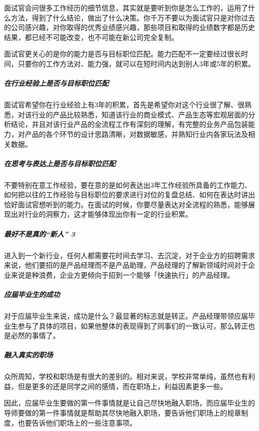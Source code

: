 \documentclass[letterpaper,10pt,english]{sphinxmanual}
\begin{document}
面试官会问很多工作经历的细节信息，其实就是要听到你是怎么工作的，运用了什么方法，得到了什么结论，做出了什么决策。你千万不要以为面试官只是对你过去的公司感兴趣，对你取得的优秀业绩感兴趣，那些项目和取得的业绩数字都是历史结果，都已经不可能改变，也不可能在新公司完全复制。

面试官更关心的是你的能力是否与目标职位匹配。能力匹配不一定要经过很长时间，只要你的工作方法对、能力强，就可以在短时间内达到别人3年或5年的积累。


\subparagraph{在行业经验上是否与目标职位匹配}
\label{\detokenize{chapter_interview/new_like:id11}}
面试官希望你在行业经验上有3年的积累，首先是希望你对这个行业很了解、很熟悉，对该行业的产品比较熟悉，知道该行业的商业模式、产品生态等宏观层面的分析结论，并且对该行业产品的全流程工作有深刻的理解，有完整的业务产品包装能力，对产品的各个环节的设计思路清晰，对数据敏感，并熟知行业内各家玩法及相关数据。


\subparagraph{在思考与表达上是否与目标职位匹配}
\label{\detokenize{chapter_interview/new_like:id12}}
不要特别在意工作经验，要在意的是如何表达出3年工作经验所具备的工作能力、如何把以往的工作经验与目标职位的要求进行对位的复盘总结、如何在表达时讲出恰好面试官想听到的能力。在面试的时候，你要尽量表达对全流程的熟悉，能够展现出对行业的洞察力，这才能够体现出你有一定的行业积累。


\subparagraph{最好不是真的“新人” 3\sphinxfootnotemark[840]}
\label{\detokenize{chapter_interview/new_like:id13}}%
\begin{footnotetext}[840]\sphinxAtStartFootnote
{}
%
\end{footnotetext}\ignorespaces 
进入到一个新行业，任何人都需要花时间去学习、去沉淀，对于企业方的招聘需求来说，他们要招的是产品经理而不是产品助理，产品经理的了解新领域时间对于企业来说是种浪费，企业方更倾向于招到一个能够「快速执行」的产品经理。


\subparagraph{应届毕业生的成功}
\label{\detokenize{chapter_interview/new_like:id14}}
对于应届毕业生来说，成功是什么？最显著的标志就是转正。产品经理带领应届毕业生参与了具体的项目，如果他整体的表现得到了同事们的一致认可，那么转正也是必然的事情了。


\subparagraph{融入真实的职场}
\label{\detokenize{chapter_interview/new_like:id15}}
众所周知，学校和职场是有很大的差别的。相对来说，学校非常单纯，虽然也有利益，但是更多的还是同学之间的感情，而在职场上，利益因素更多一些。

因此，应届毕业生要做的第一件事情就是让自己尽快地融入职场，而应届毕业生的导师要做的第一件事情就是帮助其尽快地融入职场，要告诉他们职场上的规章制度，也要告诉他们职场上的一些注意事项。
\end{document}
